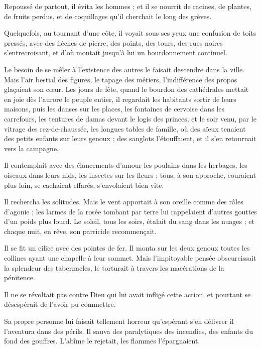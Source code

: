 \documentclass[]{book}
\begin{document}
                Repoussé de partout, il évita les hommes ; et il se nourrit de racines, de plantes, de fruits perdus, et de coquillages qu'il cherchait le long des grèves.
                    
                Quelquefois, au tournant d'une côte, il voyait sous ses yeux une confusion de toits pressés, avec des flèches de pierre, des points, des tours, des rues noires s'entrecroisant, et d'où montait jusqu'à lui un bourdonnement continuel.
                    
                Le besoin de se mêler à l'existence des autres le faisait descendre dans la ville. Mais l'air bestial des figures, le tapage des métiers, l'indifférence des propos glaçaient son cœur. Les jours de fête, quand le bourdon des cathédrales mettait en joie dès l'aurore le peuple entier, il regardait les habitants sortir de leurs maisons, puis les danses sur les places, les fontaines de cervoise dans les carrefours, les tentures de damas devant le logis des princes, et le soir venu, par le vitrage des rez-de-chaussée, les longues tables de famille, où des aïeux tenaient des petits enfants sur leurs genoux ; des sanglots l'étouffaient, et il s'en retournait vers la campagne.
                    
                Il contemplait avec des élancements d'amour les poulains dans les herbages, les oiseaux dans leurs nids, les insectes sur les fleurs ; tous, à son approche, couraient plus loin, se cachaient effarés, s'envolaient bien vite.
                    
                Il rechercha les solitudes. Mais le vent apportait à son oreille comme des râles d'agonie ; les larmes de la rosée tombant par terre lui rappelaient d'autres gouttes d'un poids plus lourd. Le soleil, tous les soirs, étalait du sang dans les nuages ; et chaque nuit, en rêve, son parricide recommençait.
                    
                Il se fit un cilice avec des pointes de fer. Il monta sur les deux genoux toutes les collines ayant une chapelle à leur sommet. Mais l'impitoyable pensée obscurcissait la splendeur des tabernacles, le torturait à travers les macérations de la pénitence.
                    
                Il ne se révoltait pas contre Dieu qui lui avait infligé cette action, et pourtant se désespérait de l'avoir pu commettre.
                    
                Sa propre personne lui faisait tellement horreur qu'espérant s'en délivrer il l'aventura dans des périls. Il sauva des paralytiques des incendies, des enfants du fond des gouffres. L'abîme le rejetait, les flammes l'épargnaient.
                    
\end{document}
